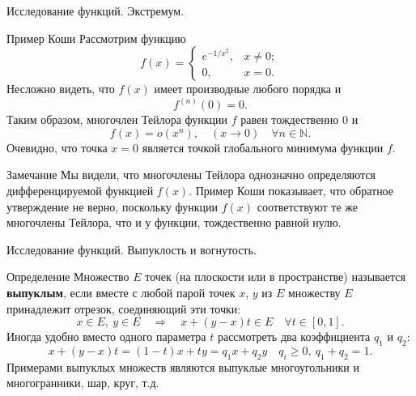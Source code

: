 \documentclass[8pt]{beamer}
\begin{document}
\begin{frame}{Исследование функций. Экстремум.}
\begin{block}{Пример Коши}
Рассмотрим функцию
$$f(x) = \left\{
\begin{array}{ll}
e^{-1/x^2},& x\ne0;\\[.5em]
0,& x=0.
\end{array}\right.
$$
Несложно видеть, что $f(x)$ имеет производные любого порядка и 
$$f^{(n)}(0) = 0.$$
Таким образом, многочлен Тейлора функции $f$ равен тождественно $0$ и
$$f(x) = o(x^n),\quad (x\to0)\quad \forall n\in \mathbb{N}.$$
Очевидно, что точка $x=0$ является точкой глобального минимума функции $f$.
\end{block}
\begin{block}{Замечание}
Мы видели, что многочлены Тейлора однозначно определяются дифференцируемой функцией $f(x)$. Пример Коши показывает, что обратное утверждение не верно, поскольку функции $f(x)$ соответствуют те же многочлены Тейлора, что и у функции, тождественно равной нулю.
\end{block}
\end{frame}

\begin{frame}{Исследование функций. Выпуклость и вогнутость.}

\begin{block}{Определение}
Множество $E$ точек (на плоскости или в пространстве) называется {\bf выпуклым}, если вместе с любой парой точек $x$, $y$ из $E$ множеству $E$ принадлежит отрезок, соединяющий эти точки:
$$x\in E,\ y\in E \quad \Rightarrow \quad x+(y-x) t\in E \quad \forall t\in[0,1].$$
Иногда удобно вместо одного параметра $t$ рассмотреть два коэффициента $q_1$ и $q_2$:
$$x+(y-x) t=(1-t) x+t y=q_1 x+q_2 y\quad q_i\ge0,\ q_1+q_2=1.$$
Примерами выпуклых множеств являются выпуклые многоугольники и многогранники, шар, круг, т.д.
\end{block}
\end{frame}
\end{document}
